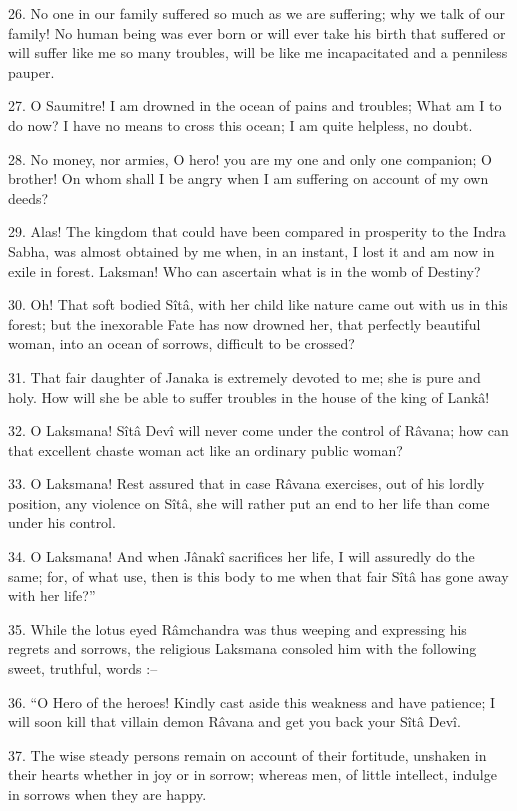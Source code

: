 26. No one in our family suffered so much as we are suffering; why we talk of our family! No human being was ever born or will ever take his birth that suffered or will suffer like me so many troubles, will be like me incapacitated and a penniless pauper.

27. O Saumitre! I am drowned in the ocean of pains and troubles; What am I to do now? I have no means to cross this ocean; I am quite helpless, no doubt.

28. No money, nor armies, O hero! you are my one and only one companion; O brother! On whom shall I be angry when I am suffering on account of my own deeds?

29. Alas! The kingdom that could have been compared in prosperity to the Indra Sabha, was almost obtained by me when, in an instant, I lost it and am now in exile in forest. Laksman! Who can ascertain what is in the womb of Destiny?

30. Oh! That soft bodied S\^it\^a, with her child like nature came out with us in this forest; but the inexorable Fate has now drowned her, that perfectly beautiful woman, into an ocean of sorrows, difficult to be crossed?

31. That fair daughter of Janaka is extremely devoted to me; she is pure and holy. How will she be able to suffer troubles in the house of the king of Lank\^a!

32. O Laksmana! S\^it\^a Dev\^i will never come under the control of R\^avana; how can that excellent chaste woman act like an ordinary public woman?

33. O Laksmana! Rest assured that in case R\^avana exercises, out of his lordly position, any violence on S\^it\^a, she will rather put an end to her life than come under his control.

34. O Laksmana! And when J\^anak\^i sacrifices her life, I will assuredly do the same; for, of what use, then is this body to me when that fair S\^it\^a has gone away with her life?''

35. While the lotus eyed R\^amchandra was thus weeping and expressing his regrets and sorrows, the religious Laksmana consoled him with the following sweet, truthful, words :--

36. ``O Hero of the heroes! Kindly cast aside this weakness and have patience; I will soon kill that villain demon R\^avana and get you back your S\^it\^a Dev\^i.

37. The wise steady persons remain on account of their fortitude, unshaken in their hearts whether in joy or in sorrow; whereas men, of little intellect, indulge in sorrows when they are happy.

